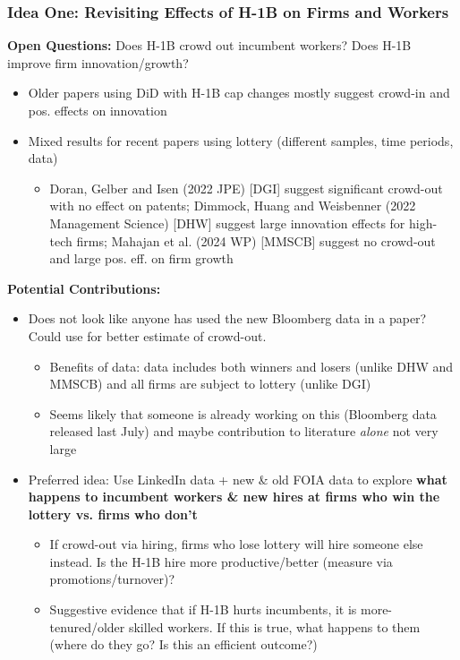 \documentclass[xcolor=dvipsnames, compress, 12pt, aspectratio=169, handout]{beamer}
\begin{document}
\begin{frame}[allowframebreaks]\label{idea2}
    \frametitle{Idea One: Revisiting Effects of H-1B on Firms and Workers}
    \textbf{Open Questions:} Does H-1B crowd out incumbent workers? Does H-1B improve firm innovation/growth? \hyperlink{h1blit}{}
    \begin{itemize}
        \item Older papers using DiD with H-1B cap changes mostly suggest crowd-in and pos. effects on innovation \hyperlink{h1bpolicy}{}
        \item Mixed results for recent papers using lottery (different samples, time periods, data)
        \begin{itemize}
            \item Doran, Gelber and Isen (2022 JPE) [DGI] suggest significant crowd-out with no effect on patents; Dimmock, Huang and Weisbenner (2022 Management Science) [DHW] suggest large innovation effects for high-tech firms; Mahajan et al. (2024 WP) [MMSCB] suggest no crowd-out and large pos. eff. on firm growth
        \end{itemize}
    \end{itemize}
    \framebreak 
    \textbf{Potential Contributions:}
    \begin{itemize}
        \item Does not look like anyone has used the new Bloomberg data in a paper? Could use for better estimate of crowd-out.
        \begin{itemize}
            \item Benefits of data: data includes both winners and losers (unlike DHW and MMSCB) and all firms are subject to lottery (unlike DGI)
            \item Seems likely that someone is already working on this (Bloomberg data released last July) and maybe contribution to literature \textit{alone} not very large
        \end{itemize}
        \item Preferred idea: Use LinkedIn data + new \& old FOIA data to explore \textbf{what happens to incumbent workers \& new hires at firms who win the lottery vs. firms who don't}
        \begin{itemize}
            \item If crowd-out via hiring, firms who lose lottery will hire someone else instead. Is the H-1B hire more productive/better (measure via promotions/turnover)?
            \item Suggestive evidence that if H-1B hurts incumbents, it is more-tenured/older skilled workers. If this is true, what happens to them (where do they go? Is this an efficient outcome?)

\end{itemize}
\end{itemize}
\end{frame}
\end{document}
